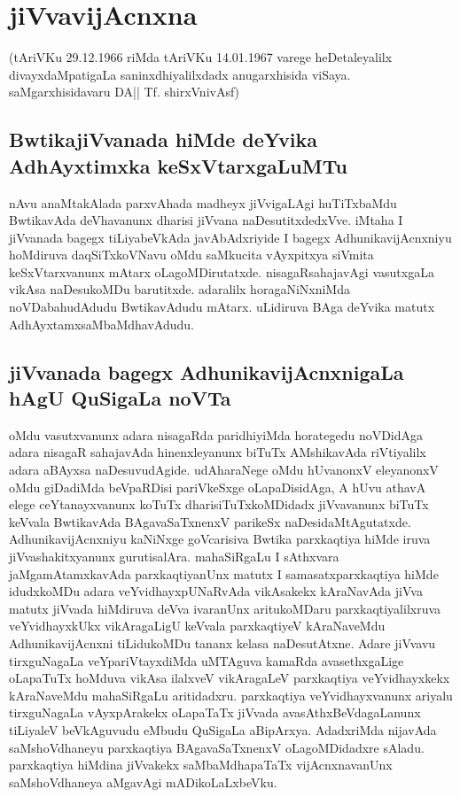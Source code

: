\chapter{jiVvavijAcnxna}

(tAriVKu 29.12.1966 riMda tAriVKu 14.01.1967 varege heDetaleyalilx divayxdaMpatigaLa saninxdhiyalilxdadx anugarxhisida viSaya. saMgarxhisidavaru DA|| Tf. shirxVnivAsf)

\section*{BwtikajiVvanada hiMde deYvika AdhAyxtimxka keSxVtarxgaLuMTu}

nAvu anaMtakAlada parxvAhada madheyx jiVvigaLAgi huTiTxbaMdu BwtikavAda deVhavanunx dharisi jiVvana naDesutitxdedxVve. iMtaha I jiVvanada bagegx tiLiyabeVkAda javAbAdxriyide I bagegx AdhunikavijAcnxniyu hoMdiruva daqSiTxkoVNavu oMdu saMkucita vAyxpitxya siVmita keSxVtarxvanunx mAtarx oLagoMDirutatxde. nisagaRsahajavAgi vasutxgaLa vikAsa naDesukoMDu barutitxde. adaralilx horagaNiNxniMda noVDabahudAdudu BwtikavAdudu mAtarx. uLidiruva BAga deYvika matutx AdhAyxtamxsaMbaMdhavAdudu.

\section*{jiVvanada bagegx AdhunikavijAcnxnigaLa hAgU QuSigaLa noVTa}

oMdu vasutxvanunx adara nisagaRda paridhiyiMda horategedu noVDidAga adara nisagaR sahajavAda hinenxleyanunx biTuTx AMshikavAda riVtiyalilx adara aBAyxsa naDesuvudAgide. udAharaNege oMdu hUvanonxV eleyanonxV oMdu giDadiMda beVpaRDisi pariVkeSxge oLapaDisidAga, A hUvu athavA elege ceYtanayxvanunx koTuTx dharisiTuTxkoMDidadx jiVvavanunx biTuTx keVvala BwtikavAda BAgavaSaTxnenxV parikeSx naDesidaMtAgutatxde. AdhunikavijAcnxniyu kaNiNxge goVcarisiva Bwtika parxkaqtiya hiMde iruva jiVvashakitxyanunx gurutisalAra. mahaSiRgaLu I sAthxvara jaMgamAtamxkavAda parxkaqtiyanUnx matutx I samasatxparxkaqtiya hiMde idudxkoMDu adara veYvidhayxpUNaRvAda vikAsakekx kAraNavAda jiVva matutx jiVvada hiMdiruva deVva ivaranUnx aritukoMDaru parxkaqtiyalilxruva veYvidhayxkUkx vikAragaLigU keVvala parxkaqtiyeV kAraNaveMdu AdhunikavijAcnxni tiLidukoMDu tananx kelasa naDesutAtxne. Adare jiVvavu tirxguNagaLa veYpariVtayxdiMda uMTAguva kamaRda avasethxgaLige oLapaTuTx hoMduva vikAsa ilalxveV vikAragaLeV parxkaqtiya veYvidhayxkekx kAraNaveMdu mahaSiRgaLu aritidadxru. parxkaqtiya veYvidhayxvanunx ariyalu tirxguNagaLa vAyxpArakekx oLapaTaTx jiVvada avasAthxBeVdagaLanunx tiLiyaleV beVkAguvudu eMbudu QuSigaLa aBipArxya. AdadxriMda nijavAda saMshoVdhaneyu parxkaqtiya BAgavaSaTxnenxV oLagoMDidadxre sAladu. parxkaqtiya hiMdina jiVvakekx saMbaMdhapaTaTx vijAcnxnavanUnx saMshoVdhaneya aMgavAgi mADikoLaLxbeVku.

